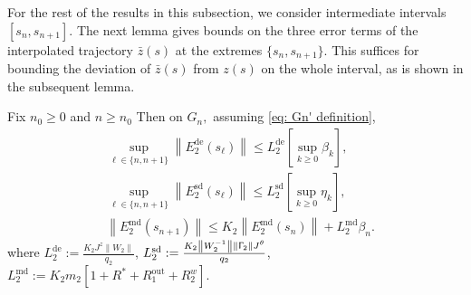 \documentclass[usenames,dvipsnames,final,12pt]{colt2018} %
\newcommand{\Rto}{R_1^\textrm{out}}
\newcommand{\Tw}{\Upgamma_2}
\newcommand{\Ww}{W_2}
\newcommand{\sw}{\beta}
\newcommand{\mw}{m_2}
\newcommand{\lz}{q_2}
\newcommand{\barz}{\bar{z}}
\newcommand{\Ez}{E_2}
\newcommand{\LzD}{L_2^{\dt}}
\newcommand{\LzM}{L_2^{\md}}
\newcommand{\LzS}{L_2^{\sd}}
\newcommand{\Kz}{K_2}
\newcommand{\EzD}{\Ez^{\dt}}
\newcommand{\EzM}{\Ez^{\md}}
\newcommand{\EzS}{\Ez^{\sd}}
\newcommand{\dt}{\text{de}}
\newcommand{\md}{\text{md}}
\newcommand{\sd}{\text{sd}}
\newcommand{\sI}[1]{s_{#1}}
\newcommand{\norm}[1]{\left\lVert#1\right\rVert}
\newcommand{\Rw}{R_2^w}
\newcommand{\Rs}{R^*}
\newcommand{\Jt}{J^\theta}
\newcommand{\Jz}{J^z}
\newcommand{\gal}[1]{#1}
\newcommand{\gugan}[1]{#1}
\begin{document}
For the rest of the results in this subsection, we consider intermediate intervals $[s_n,s_{n+1}]$. The next lemma gives bounds on the three error terms of the interpolated trajectory $\barz(s)$  at the extremes $\{s_n,s_{n+1}\}$. \gal{This suffices for bounding the deviation of $\barz(s)$ from $z(s)$ on the whole interval, as is shown in the subsequent lemma}.


\begin{lemma}
\label{lem:EzDBd}
%
Fix $n_0 \geq 0$ and $n \geq n_0$ Then on $G_n,$ \gugan{assuming \eqref{eq: Gn' definition}},
%
\begin{align*}
&\sup_{\ell \in \{n, n + 1\}} \norm{\EzD(\sI{\ell})} \leq \LzD \left[\sup_{k \geq 0} \sw_k\right], \\
&\sup_{\ell \in \{n, n+ 1\}} \norm{\EzS(\sI{\ell})} \leq \LzS \left[\sup_{k \geq 0} \eta_k \right],\\
&\norm{\EzM(\sI{n + 1})} \leq \Kz \norm{\EzM(\sI{n})} +  \LzM \sw_n. 	
\end{align*}
%
where
$\LzD := \frac{\Kz \Jz \norm{\Ww}}{ \lz}$,
$\LzS := \frac{\Kz \norm{\Ww^{-1}}\norm{\Tw} \Jt}{\lz}$, $\LzM := \Kz \mw[1 + \Rs + \Rto + \Rw].$
\end{lemma}
\end{document}
